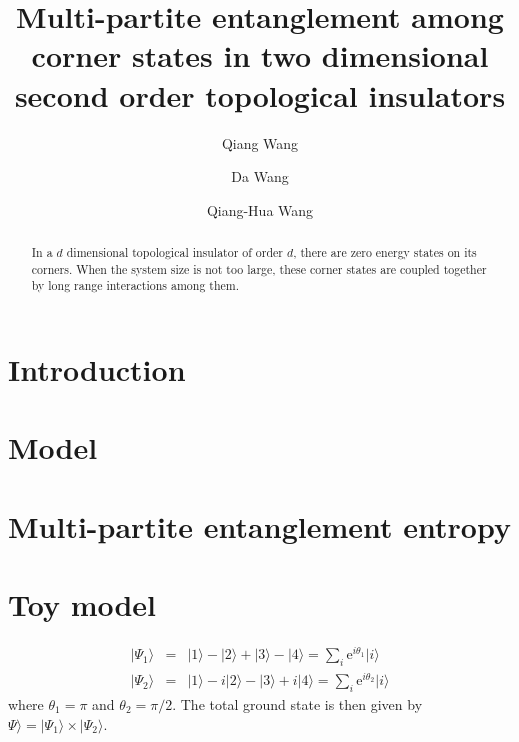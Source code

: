 \documentclass[aps,twocolumn,superscriptaddress]{revtex4-1}
\begin{document}
\title{Multi-partite entanglement among corner states in two dimensional second order topological insulators}
\author{Qiang Wang}
\author{Da Wang}
\author{Qiang-Hua Wang}
\begin{abstract}
  In a $d$ dimensional topological insulator of order $d$, there are zero energy states on its corners.
  When the system size is not too large, these corner states are coupled together by long range interactions among them. 
\end{abstract}
\maketitle
\section{Introduction}
%
%


\section{Model}

\section{Multi-partite entanglement entropy}
\section{Toy model}

\begin{eqnarray}
  |\Psi_1\rangle&=&|1\rangle-|2\rangle+|3\rangle-|4\rangle=\sum_i \mathrm{e}^{i\theta_1}|i\rangle \\
  |\Psi_2\rangle&=&|1\rangle-i|2\rangle-|3\rangle+i|4\rangle=\sum_i \mathrm{e}^{i\theta_2}|i\rangle 
\end{eqnarray}
where $\theta_1=\pi$ and $\theta_2=\pi/2$. 
The total ground state is then given by $\Psi\rangle=|\Psi_1\rangle \times |\Psi_2\rangle$. 
\end{document}
